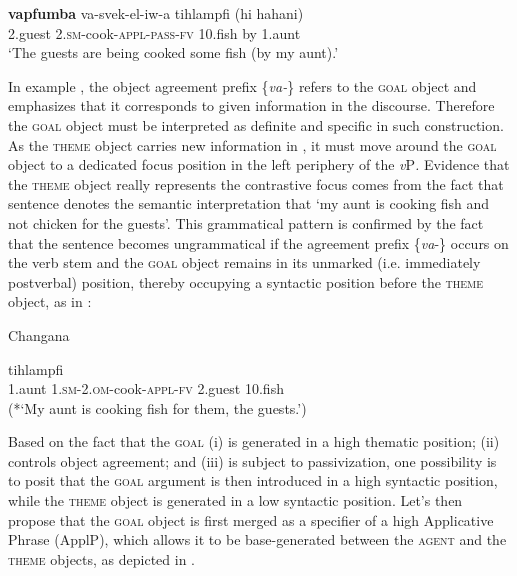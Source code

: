 \documentclass[output=paper]{langsci/langscibook}
\begin{document}
\ea
\gll \textbf{vapfumba}     va-svek-el-iw-a                       tihlampfi         (hi    hahani)\\
     2.guest          2.\textsc{sm-}cook-\textsc{appl-pass}{}-\textsc{fv}       10.fish              by    1.aunt\\
\glt ‘The guests are being cooked some fish (by my aunt).’
\z

{In example , the object agreement prefix \{}{\textit{va-}}{\} refers to the }{\textsc{goal}} {object and emphasizes that it corresponds to given information in the discourse. Therefore the }{\textsc{goal}} {object must be interpreted as definite and specific in such construction. As the }{\textsc{theme}} {object carries new information in , it must move around the }{\textsc{goal}} {object to a dedicated focus position in the left periphery of the }{\textit{v}}{P}{\textit{. }}{Evidence that the }{\textsc{theme}} {object really represents the contrastive focus comes from the fact that sentence  denotes the semantic interpretation that ‘my aunt is cooking fish and not chicken for the guests’. This grammatical pattern is confirmed by the fact that the sentence becomes ungrammatical if the agreement prefix \{}{\textit{va}}{{}-\} occurs on the verb stem and the }{\textsc{goal}} {object remains in its unmarked (i.e. immediately postverbal) position, thereby occupying a syntactic position before the }{\textsc{theme}} {object, as }in :

{Changana}

\ea
{}         {tihlampfi}\\
     1.aunt          1.{\textsc{sm}}{{}-2.}{\textsc{om}}{{}-}cook{{}-}{\textsc{appl}}{{}-}{\textsc{fv}}       {}2.guest             {10.}fish\\
\glt (*‘My aunt is cooking fish for them, the guests.’)
\z



Based on the fact that the \textsc{goal} (i) is generated in a high thematic position; (ii) controls object agreement; and (iii) is subject to passivization, one possibility is to posit that the \textsc{goal} argument is then introduced in a high syntactic position, while the \textsc{theme} object is generated in a low syntactic position. Let’s then propose that the \textsc{goal} object is first merged as a specifier of a high Applicative Phrase (ApplP), which allows it to be base-generated between the \textsc{agent} and the \textsc{theme} objects, as depicted in .
\end{document}
